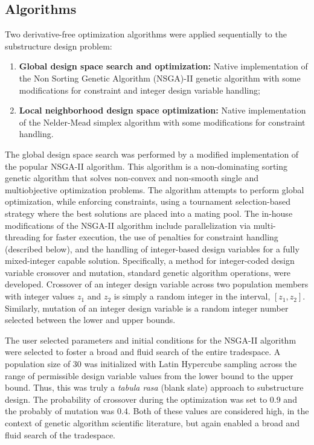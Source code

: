 \subsection{Algorithms}
Two derivative-free optimization algorithms were applied sequentially to
the substructure design problem:
\begin{enumerate}
\item \textbf{Global design space search and optimization:} Native
  implementation of the Non Sorting Genetic Algorithm (NSGA)-II genetic
  algorithm \citep{nsga2} with some modifications for constraint and
  integer design variable handling;
\item \textbf{Local neighborhood design space optimization:} Native
  implementation of the Nelder-Mead simplex algorithm \citep{neldermead}  with some
  modifications for constraint handling.
\end{enumerate}

The global design space search was performed by a modified
implementation of the popular NSGA-II \citep{nsga2} algorithm.  This algorithm is
a non-dominating sorting genetic algorithm that solves non-convex and
non-smooth single and multiobjective optimization problems. The
algorithm attempts to perform global optimization, while enforcing
constraints, using a tournament selection-based strategy where the best
solutions are placed into a mating pool.  The in-house modifications of the
NSGA-II algorithm include parallelization via multi-threading for faster
execution, the use of penalties for constraint handling (described
below), and the handling of integer-based design variables for a fully
mixed-integer capable solution.  Specifically, a method for
integer-coded design variable crossover and mutation, standard genetic
algorithm operations, were developed.  Crossover of an integer design
variable across two population members with integer values $z_1$ and
$z_2$ is simply a random integer in the interval, $[z_1, z_2]$.
Similarly, mutation of an integer design variable is a random integer
number selected between the lower and upper bounds.

The user selected parameters and initial conditions for the NSGA-II
algorithm were selected to foster a broad and fluid search of the entire
tradespace.  A population size of 30 was initialized with Latin
Hypercube sampling across the range of permissible design variable
values from the lower bound to the upper bound.  Thus, this was truly a
\textit{tabula rasa} (blank slate) approach to substructure design.  The
probability of crossover during the optimization was set to 0.9 and the
probably of mutation was 0.4.  Both of these values are considered high,
in the context of genetic algorithm scientific literature, but again
enabled a broad and fluid search of the tradespace.

